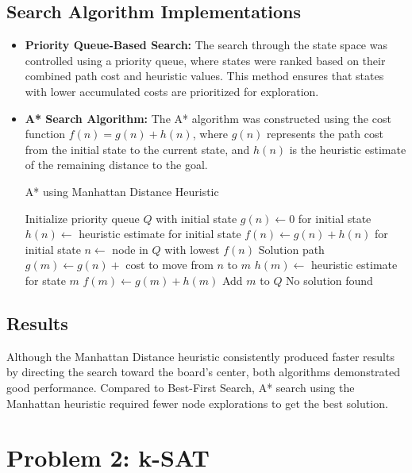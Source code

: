 \documentclass[conference]{IEEEtran}
\begin{document}
\subsection{Search Algorithm Implementations}
\begin{itemize}
    \item \textbf{Priority Queue-Based Search:} The search through the state space was controlled using a priority queue, where states were ranked based on their combined path cost and heuristic values. This method ensures that states with lower accumulated costs are prioritized for exploration.
    \item \textbf{A* Search Algorithm:} The A* algorithm was constructed using the cost function $f(n) = g(n) + h(n)$, where $g(n)$ represents the path cost from the initial state to the current state, and $h(n)$ is the heuristic estimate of the remaining distance to the goal.
\\

\begin{algorithm}
\caption{A* using Manhattan Distance Heuristic}
\begin{algorithmic}[1]
\State Initialize priority queue $Q$ with initial state
\State $g(n) \gets 0$ for initial state
\State $h(n) \gets$ heuristic estimate for initial state
\State $f(n) \gets g(n) + h(n)$ for initial state
    \State $n \gets$ node in $Q$ with lowest $f(n)$
        \State \Return Solution path
    \EndIf
        \State $g(m) \gets g(n) +$ cost to move from $n$ to $m$
        \State $h(m) \gets$ heuristic estimate for state $m$
        \State $f(m) \gets g(m) + h(m)$
        \State Add $m$ to $Q$
    \EndFor
\EndWhile
\State \Return No solution found
\end{algorithmic}
\end{algorithm}

\end{itemize}
\subsection{Results}
Although the Manhattan Distance heuristic consistently produced faster results by directing the search toward the board's center, both algorithms demonstrated good performance. Compared to Best-First Search, A* search using the Manhattan heuristic required fewer node explorations to get the best solution.

\section{Problem 2: k-SAT}
\end{document}
